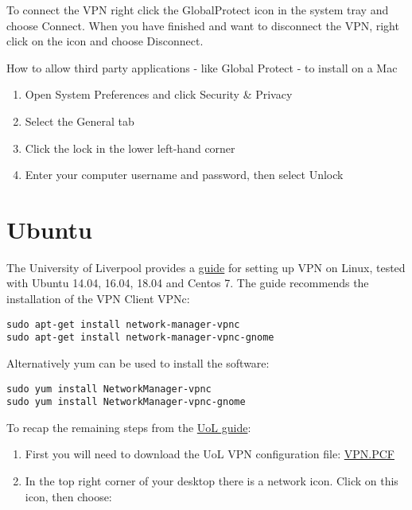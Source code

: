 \documentclass[
]{book}
\providecommand{\tightlist}{%
  \setlength{\itemsep}{0pt}\setlength{\parskip}{0pt}}
\begin{document}
To connect the VPN right click the GlobalProtect icon in the system tray and choose Connect.
When you have finished and want to disconnect the VPN, right click on the icon and choose Disconnect.

How to allow third party applications - like Global Protect - to install on a Mac

\begin{enumerate}
\def\labelenumi{\arabic{enumi})}
\item
  Open System Preferences and click Security \& Privacy
\item
  Select the General tab
\item
  Click the lock in the lower left-hand corner
\item
  Enter your computer username and password, then select Unlock
\end{enumerate}

\hypertarget{ubuntu}{%
\section{Ubuntu}\label{ubuntu}}

The University of Liverpool provides a \href{https://liverpool.service-now.com/sp/?id=kb_article\&sysparm_article=KB0010404\&sys_kb_id=52bfb8303717e200d6fa4a7a43990ef9}{guide}
for setting up VPN on Linux, tested with Ubuntu 14.04, 16.04, 18.04 and Centos 7. The guide recommends the
installation of the VPN Client VPNc:

\begin{verbatim}
sudo apt-get install network-manager-vpnc
sudo apt-get install network-manager-vpnc-gnome
\end{verbatim}

Alternatively yum can be used to install the software:

\begin{verbatim}
sudo yum install NetworkManager-vpnc
sudo yum install NetworkManager-vpnc-gnome
\end{verbatim}

To recap the remaining steps from the \href{https://liverpool.service-now.com/sp/?id=kb_article\&sysparm_article=KB0010404\&sys_kb_id=52bfb8303717e200d6fa4a7a43990ef9}{UoL guide}:

\begin{enumerate}
\def\labelenumi{\arabic{enumi})}
\tightlist
\item
  First you will need to download the UoL VPN configuration file:
  \href{https://pcwww.liv.ac.uk/csd/vpn/University\%20of\%20Liverpool\%20VPN.PCF}{VPN.PCF}
\item
  In the top right corner of your desktop there is a network icon.
  Click on this icon, then choose:
\end{enumerate}
\end{document}
